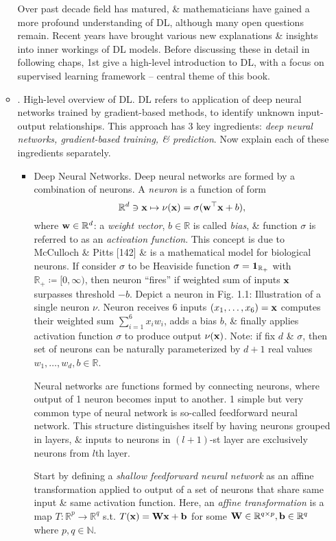 \documentclass{article}
\begin{document}
\begin{itemize}
\begin{itemize}
		Over past decade field has matured, \& mathematicians have gained a more profound understanding of DL, although many open questions remain. Recent years have brought various new explanations \& insights into inner workings of DL models. Before discussing these in detail in following chaps, 1st give a high-level introduction to DL, with a focus on supervised learning framework -- central theme of this book.
		\item {. High-level overview of DL.} DL refers to application of deep neural networks trained by gradient-based methods, to identify unknown input-output relationships. This approach has 3 key ingredients: {\it deep neural networks, gradient-based training, \& prediction}. Now explain each of these ingredients separately.
		\begin{itemize}
			\item {\sf Deep Neural Networks.} Deep neural networks are formed by a combination of neurons. A {\it neuron} is a function of form
			\begin{equation}
				\label{neuron}
				\mathbb{R}^d\ni{\bf x}\mapsto\nu({\bf x}) = \sigma({\bf w}^\top{\bf x} + b),
			\end{equation}
			where ${\bf w}\in\mathbb{R}^d$: a {\it weight vector}, $b\in\mathbb{R}$ is called {\it bias}, \& function $\sigma$ is referred to as an {\it activation function}. This concept is due to McCulloch \& Pitts [142] \& is a mathematical model for biological neurons. If consider $\sigma$ to be Heaviside function $\sigma = {\bf1}_{\mathbb{R}_+}$ with $\mathbb{R}_+\coloneqq[0,\infty)$, then neuron ``fires'' if weighted sum of inputs ${\bf x}$ surpasses threshold $-b$. Depict a neuron in {\sf Fig. 1.1: Illustration of a single neuron $\nu$. Neuron receives 6 inputs $(x_1,\ldots,x_6) = {\bf x}$ computes their weighted sum $\sum_{i=1}^6 x_iw_i$, adds a bias $b$, \& finally applies activation function $\sigma$ to produce output $\nu({\bf x})$}. Note: if fix $d$ \& $\sigma$, then set of neurons can be naturally parameterized by $d + 1$ real values $w_1,\ldots,w_d,b\in\mathbb{R}$.

			Neural networks are functions formed by connecting neurons, where output of 1 neuron becomes input to another. 1 simple but very common type of neural network is so-called feedforward neural network. This structure distinguishes itself by having neurons grouped in layers, \& inputs to neurons in $(l + 1)$-st layer are exclusively neurons from $l$th layer.

			Start by defining a {\it shallow feedforward neural network} as an affine transformation applied to output of a set of neurons that share same input \& same activation function. Here, an {\it affine transformation} is a map $T:\mathbb{R}^p\to\mathbb{R}^q$ s.t. $T({\bf x}) = {\bf W}{\bf x} + {\bf b}$ for some ${\bf W}\in\mathbb{R}^{q\times p},{\bf b}\in\mathbb{R}^q$ where $p,q\in\mathbb{N}$.


\end{itemize}
\end{itemize}
\end{itemize}
\end{document}
